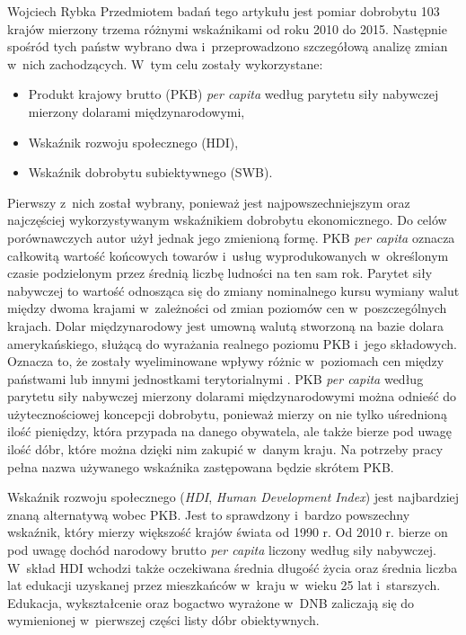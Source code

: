 \begin{artplenv}{Wojciech Rybka}
Przedmiotem badań tego artykułu jest pomiar dobrobytu 103 krajów mierzony trzema różnymi wskaźnikami od roku 2010 do
2015. Następnie spośród tych państw wybrano dwa i~przeprowadzono szczegółową analizę zmian w~nich zachodzących.
W~tym celu zostały wykorzystane: 

\begin{itemize}
\item Produkt krajowy brutto (PKB) \textit{per capita} według parytetu siły nabywczej mierzony dolarami międzynarodowymi,
\item Wskaźnik rozwoju społecznego (HDI),
\item Wskaźnik dobrobytu subiektywnego (SWB).
\end{itemize}

Pierwszy z~nich został wybrany, ponieważ jest najpowszechniejszym oraz najczęściej wykorzystywanym wskaźnikiem dobrobytu
ekonomicznego. Do celów porównawczych autor użył jednak jego zmienioną formę. PKB \textit{per capita} oznacza całkowitą wartość
końcowych towarów i~usług wyprodukowanych w~określonym czasie podzielonym przez średnią liczbę ludności na ten sam rok.
Parytet siły nabywczej to wartość odnosząca się do zmiany nominalnego kursu wymiany walut między dwoma krajami
w~zależności od zmian
poziomów cen w~poszczególnych krajach. Dolar międzynarodowy jest umowną walutą stworzoną na bazie dolara
amerykańskiego, służącą do wyrażania realnego poziomu PKB i~jego składowych. Oznacza to, że zostały wyeliminowane
wpływy różnic w~poziomach cen między państwami lub innymi jednostkami terytorialnymi
\parencite{international_monetary_fund_world_2019a}.
PKB \textit{per capita} według parytetu siły nabywczej mierzony
dolarami międzynarodowymi można odnieść do użytecznościowej koncepcji dobrobytu, ponieważ mierzy on nie tylko
uśrednioną ilość pieniędzy, która przypada na danego obywatela, ale także bierze pod uwagę ilość dóbr, które można
dzięki nim zakupić w~danym kraju. Na potrzeby pracy pełna nazwa używanego wskaźnika zastępowana będzie skrótem PKB.

Wskaźnik rozwoju społecznego (\textit{HDI}, \textit{Human Development Index}) jest najbardziej znaną alternatywą wobec
PKB. Jest to sprawdzony i~bardzo powszechny wskaźnik, który mierzy większość krajów świata od 1990 r. Od 2010 r. bierze
on pod uwagę dochód narodowy brutto \textit{per capita} liczony według siły nabywczej.
W~skład HDI wchodzi także oczekiwana średnia długość życia oraz średnia liczba lat
edukacji uzyskanej przez mieszkańców w~kraju w~wieku 25 lat i~starszych. Edukacja, wykształcenie oraz bogactwo
wyrażone w~DNB zaliczają się do wymienionej w~pierwszej części listy dóbr obiektywnych.


\end{artplenv}
